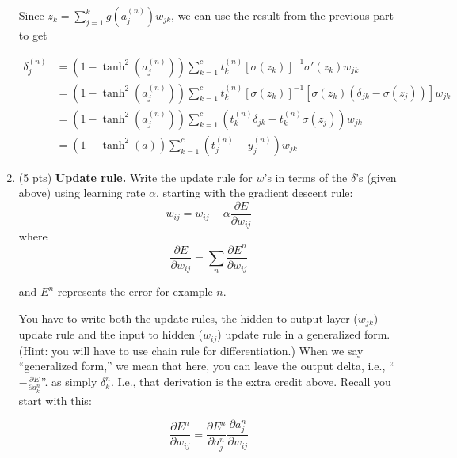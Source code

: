 \begin{enumerate}[label=(\alph*)]
\begin{tcolorbox}
\begin{tcolorbox}[title={Hidden Layer Derivation}]
			      Since $z_k = \sum_{j = 1}^{k} g \left( a_j^{(n)} \right) w_{jk}$, we can use the result from the
			      previous part to get

			      \begin{align*}
              \delta_j^{(n)} & =  (1 - \tanh^2 (a_j^{(n)})) \sum_{k=1}^c t_k^{(n)} \left[\sigma\left( z_k \right)\right]^{-1} \sigma'\left( z_k \right)  w_{jk} \\
                             & =  (1 - \tanh^2 (a_j^{(n)})) \sum_{k=1}^c t_k^{(n)} \left[\sigma\left( z_k \right)\right]^{-1} \left[ \sigma\left( z_k \right) \left( \delta_{jk} - \sigma(z_j) \right) \right]w_{jk} \\
                             & =  (1 - \tanh^2 (a_j^{(n)})) \sum_{k=1}^c \left( t_k^{(n)} \delta_{jk} - t_k^{(n)} \sigma(z_j) \right) w_{jk} \\
				                     & =  (1 - \tanh^2 (a)) \sum_{k=1}^c (t_j^{(n)} - y_j^{(n)}) w_{jk}
			      \end{align*}

		      \end{tcolorbox}
	      \end{tcolorbox}

	\item (5 pts) \textbf{Update rule.} Write the update rule for $w$'s  in
	      terms of the $\delta$'s (given above) using learning rate $\alpha$,
	      starting with the gradient descent rule:
	      \begin{equation}
		      w_{ij}=w_{ij}-\alpha\frac{\partial E}{\partial w_{ij}}
	      \end{equation}
	      where
	      \begin{equation}
		      \frac{\partial E}{\partial w_{ij}} = \sum_{n}\frac{\partial E^n}{\partial w_{ij}}
	      \end{equation}

	      and $E^n$ represents the error for example $n$.

	      You have to write both the update rules, the hidden to output layer
	      ($w_{jk}$) update rule and the input to hidden ($w_{ij}$) update rule
	      in a generalized form. (Hint: you will have to use chain rule for
	      differentiation.) When we
	      say ``generalized form,'' we mean that here, you can leave the output
	      delta, i.e., ``$-\frac{\partial E}{\partial a^n_k}$''. as simply
	      $\delta_k^{n}$. I.e., that derivation is the extra credit above.
	      Recall you start with this:

	      \begin{equation}
		      \frac{\partial E^{n}}{\partial w_{ij}}=\frac{\partial
		      E^{n}}{\partial a_j^{n}}\frac{\partial a_j^{n}}{\partial w_{ij}}
	      \end{equation}


\end{enumerate}
